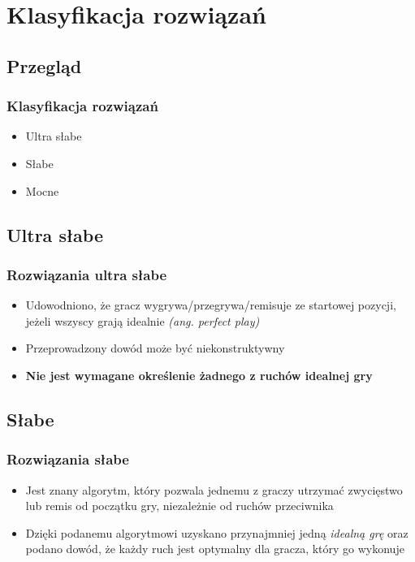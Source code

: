 \documentclass[polish,envcountsect,10pt]{beamer}
\begin{document}
    \section{Klasyfikacja rozwiązań}
        \subsection{Przegląd}
            \begin{frame}
                \frametitle{Klasyfikacja rozwiązań}
                \begin{itemize}
                    \item<1-> Ultra słabe
                    \item<2-> Słabe
                    \item<3-> Mocne
                \end{itemize}
            \end{frame}
        \subsection{Ultra słabe}
            \begin{frame}
                \frametitle{Rozwiązania ultra słabe}
                \begin{itemize}
                    \item<1-> Udowodniono, że gracz wygrywa/przegrywa/remisuje ze startowej pozycji, jeżeli wszyscy grają idealnie \textit{(ang. perfect play)}
                    \item<2-> Przeprowadzony dowód może być niekonstruktywny
                    \item<3-> \textbf{Nie jest wymagane określenie żadnego z ruchów idealnej gry}
                \end{itemize}
            \end{frame}
        \subsection{Słabe}
            \begin{frame}
                \frametitle{Rozwiązania słabe}
                \begin{itemize}
                    \item<1-> Jest znany algorytm, który pozwala jednemu z graczy utrzymać zwycięstwo lub remis od początku gry, niezależnie od ruchów przeciwnika
                    \item<2-> Dzięki podanemu algorytmowi uzyskano przynajmniej jedną \textit{idealną grę} oraz podano dowód, że każdy ruch jest optymalny dla gracza, który go wykonuje                    
                \end{itemize}     
            \end{frame}
\end{document}

